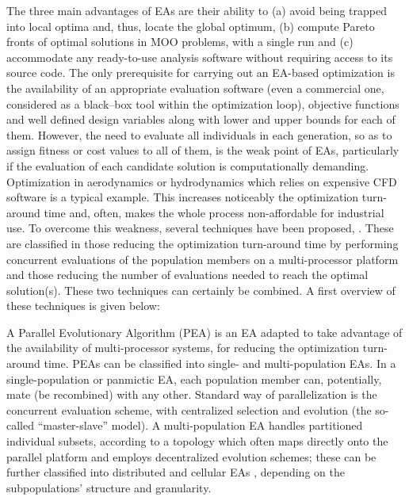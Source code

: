 The three main advantages of EAs are their ability to (a) avoid being trapped into local optima and, thus, locate the global optimum, (b) compute Pareto fronts of optimal solutions in MOO problems, with a single run and (c) accommodate any ready-to-use analysis software without requiring access to its source code. The only prerequisite for carrying out an EA-based optimization is the availability of an appropriate evaluation software (even a commercial one, considered as a black–box tool within the optimization loop), objective functions and well defined design variables along with lower and upper bounds for each of them. However, the need to evaluate all individuals in each generation, so as to assign fitness or cost values to all of them, is the weak point of EAs, particularly if the evaluation of each candidate solution is computationally demanding. Optimization in aerodynamics or hydrodynamics which relies on expensive CFD software is a typical example.  This increases noticeably the optimization turn-around time and, often, makes the whole process non-affordable for industrial use. To overcome this weakness, several techniques have been proposed, \cite{LTT_2_020,Jin2002}. These  are classified in those reducing the optimization turn-around time by performing concurrent evaluations of the population members on a multi-processor platform and those reducing the number of evaluations needed to reach the optimal solution(s). These two techniques can certainly be combined. A first overview of these techniques is given below:  

A Parallel Evolutionary Algorithm (PEA) \cite{phd_Giotis,phd_Karakasis,phd_Kampolis,phd_Vera} is an EA adapted to take advantage of the availability of multi-processor systems, for reducing the optimization turn-around time. PEAs can be classified into single- and multi-population EAs. In a single-population or panmictic EA, each population member can, potentially, mate (be recombined) with any other. Standard way of parallelization is the concurrent evaluation scheme, with centralized selection and evolution (the so-called ``master-slave'' model). A multi-population EA handles partitioned individual subsets, according to a topology which often maps directly onto the parallel platform and employs decentralized evolution schemes; these can be further classified into distributed \cite{LTT_2_023,Herr1999,LTT_2_044} and cellular EAs \cite{alba_08,Nebro:2009p48}, depending on the subpopulations’ structure and granularity. 

